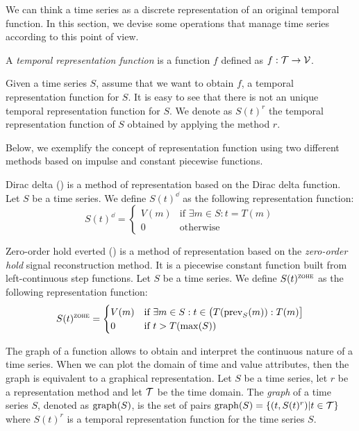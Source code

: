 We can think a time series as a discrete representation of an original
temporal function. In this section, we devise some operations that
manage time series according to this point of view.

A \emph{temporal representation function} is a function $f$ defined as
$f:\mathcal{T}\rightarrow\cal{V}$.

Given a time series $S$, assume that we want to obtain $f$, a temporal
representation function for $S$. It is easy to see that there is not
an unique temporal representation function for $S$. We denote as
$S(t)^r$ the temporal representation function of $S$ obtained by
applying the method $r$.

Below, we exemplify the concept of representation function using two
different methods based on impulse and constant piecewise functions.

\begin{definition} 
  Dirac delta (\dd) is a method of representation based on the Dirac
  delta function. Let $S$ be a time series. We define $S(t)^\dd$ as
  the following \dd{} representation function:
  \[
  S(t)^\dd
  =  \begin{cases}
          V(m) & \text{if } \exists m\in S:t=T(m) \\
          0    & \text{otherwise}
  \end{cases}
  \]
\end{definition}

\begin{definition}
  Zero-order hold everted (\zohe{}) is a method of representation
  based on the \emph{zero-order hold} signal reconstruction method. It
  is a piecewise constant function built from left-continuous step
  functions.  Let $S$ be a time series. We define $S(t)^\zohe$ as the
  following representation function:
  \[
  S(t)^\zohe 
  = \begin{cases}
    V(m) & \text{if } \exists m\in S: t\in \big(T(\prev_S(m)):T(m)\big]\\
    0    & \text{if } t > T(\max(S)) 
  \end{cases}
  \]
\end{definition}

The graph of a function allows to obtain and interpret the continuous
nature of a time series. When we can plot the domain of time and value
attributes, then the graph is equivalent to a graphical
representation.
%
Let $S$ be a time series, let $r$ be a representation method and let
$\cal{T}$ be the time domain. The \emph{graph} of a time series $S$,
denoted as $\operatorname*{graph}(S)$, is the set of pairs $\operatorname*{graph}(S)
=\{(t,S(t)^r)|t\in \cal{T}\}$ where $S(t)^r$ is a temporal
representation function for the time series $S$.


